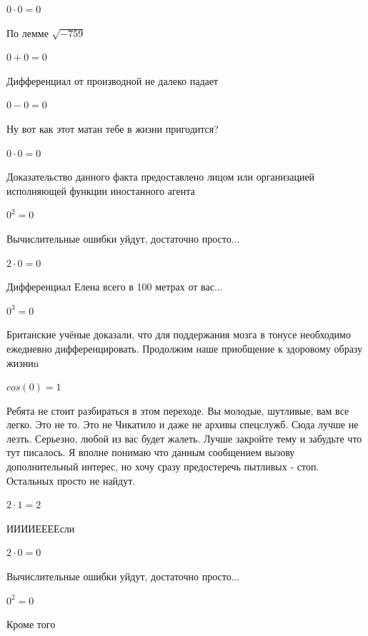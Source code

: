 \documentclass[12pt,a4paper,fleqn]{article}
\begin{document}
\begin{center}$0 \cdot 0 = 0$\end{center}
По лемме $\sqrt{-759}$
\begin{center}$0+0 = 0$\end{center}
Дифференциал от производной не далеко падает\cite{link2}

\begin{center}$0-0 = 0$\end{center}
Ну вот как этот матан тебе в жизни пригодится?

\begin{center}$0 \cdot 0 = 0$\end{center}
Доказательство данного факта предоставлено лицом или организацией исполняющей функции иностанного агента

\begin{center}$0^{2} = 0$\end{center}
Вычислительные ошибки уйдут, достаточно просто...

\begin{center}$2 \cdot 0 = 0$\end{center}
Дифференциал Елена всего в 100 метрах от вас...

\begin{center}$0^{3} = 0$\end{center}
Британские учёные доказали, что для поддержания мозга в тонусе необходимо ежедневно дифференцировать. Продолжим наше приобщение к здоровому образу жизниn

\begin{center}$cos(0) = 1$\end{center}
Ребята не стоит разбираться в этом переходе. Вы молодые, шутливые, вам все легко. Это не то. Это не Чикатило и даже не архивы спецслужб. Сюда лучше не лезть. Серьезно, любой из вас будет жалеть. Лучше закройте тему и забудьте что тут писалось. Я вполне понимаю что данным сообщением вызову дополнительный интерес, но хочу сразу предостеречь пытливых - стоп. Остальных просто не найдут.

\begin{center}$2 \cdot 1 = 2$\end{center}
ИИИИЕЕЕЕсли\cite{link3}

\begin{center}$2 \cdot 0 = 0$\end{center}
Вычислительные ошибки уйдут, достаточно просто...

\begin{center}$0^{2} = 0$\end{center}
Кроме того
\end{document}
